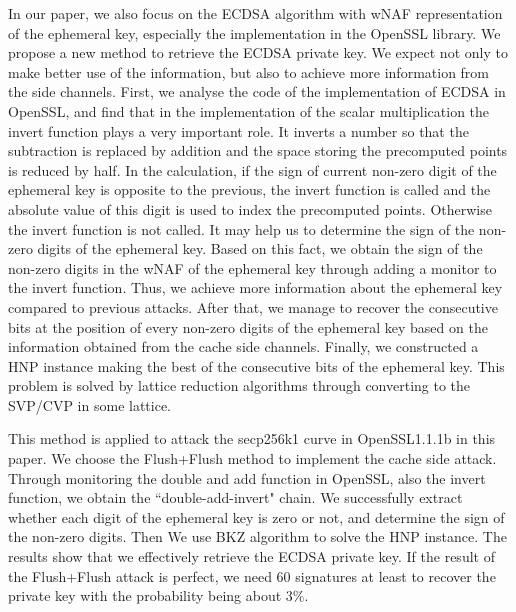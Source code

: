 In our paper, we also focus on the ECDSA algorithm with wNAF representation of the ephemeral key, especially the implementation in the OpenSSL library.
 We propose a new method to retrieve the ECDSA private key.
We expect not only to make better use of the information,
  but also to achieve more information from the side channels.
First, we analyse the code of the implementation of ECDSA in OpenSSL,
 and find that
in the implementation of the scalar multiplication the invert function plays a very important role.
It inverts a number so that the subtraction is replaced by addition and the space storing the precomputed points is reduced by half.
In the calculation, if the sign of current non-zero digit of the ephemeral key is opposite to the previous, the invert function is called  and the absolute value of this digit is used to index the precomputed points. Otherwise the invert function is not called.
It may help us to determine the sign of the non-zero digits of the ephemeral key.
  Based on this fact, we obtain the sign of the non-zero digits in the wNAF of the ephemeral key through adding a monitor to the invert function.
 Thus, we achieve more information about the ephemeral key compared to previous attacks.
After that, we manage to recover the consecutive bits at the position of every non-zero digits of the ephemeral key based on the information obtained from the cache side channels.
Finally, we constructed a HNP \cite{boneh1996} instance making the best of the consecutive bits of the ephemeral key.
This problem is solved by lattice reduction algorithms  through converting to the SVP/CVP in some lattice.

This method is applied to attack the secp256k1 curve in OpenSSL1.1.1b in this paper.
We choose the Flush+Flush\cite{gruss2016flush} method to implement the cache side attack.
Through monitoring the double and add function in OpenSSL, also the  invert function, we obtain the ``double-add-invert" chain.
We successfully extract whether each digit of the ephemeral key is zero or not, and determine the sign of the non-zero digits.
Then We use BKZ \cite{Schnorr1994} algorithm to solve the HNP instance.
The results show that we effectively retrieve the ECDSA private key.
If the result of the Flush+Flush attack is perfect, we need $60$ signatures at least to recover the private key with the probability being about $3\%$.

